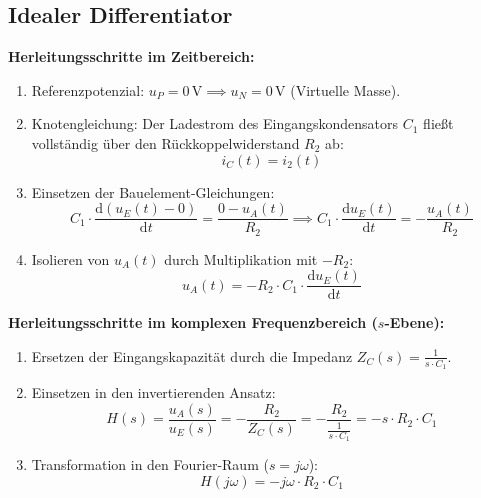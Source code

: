 \documentclass[11pt,a4paper]{article}
\begin{document}
\subsection{Idealer Differentiator}
\textbf{Herleitungsschritte im Zeitbereich:}
\begin{enumerate}
    \item Referenzpotenzial: $u_P = 0\,\text{V} \implies u_N = 0\,\text{V}$ (Virtuelle Masse).
    \item Knotengleichung: Der Ladestrom des Eingangskondensators $C_1$ fließt vollständig über den Rückkoppelwiderstand $R_2$ ab:
    \begin{equation}
    i_C(t) = i_2(t)
    \end{equation}
    \item Einsetzen der Bauelement-Gleichungen:
    \begin{equation}
    C_1 \cdot \frac{\text{d}(u_E(t) - 0)}{\text{d}t} = \frac{0 - u_A(t)}{R_2} \implies C_1 \cdot \frac{\text{d}u_E(t)}{\text{d}t} = -\frac{u_A(t)}{R_2}
    \end{equation}
    \item Isolieren von $u_A(t)$ durch Multiplikation mit $-R_2$:
    \begin{equation}
    u_A(t) = -R_2 \cdot C_1 \cdot \frac{\text{d}u_E(t)}{\text{d}t}
    \end{equation}
\end{enumerate}

\textbf{Herleitungsschritte im komplexen Frequenzbereich ($s$-Ebene):}
\begin{enumerate}
    \item Ersetzen der Eingangskapazität durch die Impedanz $Z_C(s) = \frac{1}{s \cdot C_1}$.
    \item Einsetzen in den invertierenden Ansatz:
    \begin{equation}
    H(s) = \frac{u_A(s)}{u_E(s)} = -\frac{R_2}{Z_C(s)} = -\frac{R_2}{\frac{1}{s \cdot C_1}} = -s \cdot R_2 \cdot C_1
    \end{equation}
    \item Transformation in den Fourier-Raum ($s = j\omega$):
    \begin{equation}
    H(j\omega) = -j\omega \cdot R_2 \cdot C_1
    \end{equation}
\end{enumerate}

\newpage

\end{document}
